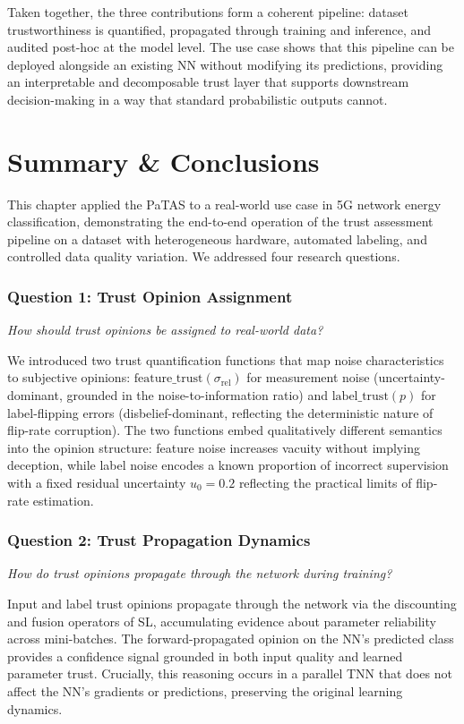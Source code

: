 Taken together, the three contributions form a coherent pipeline: dataset trustworthiness is quantified, propagated through training and inference, and audited post-hoc at the model level. The use case shows that this pipeline can be deployed alongside an existing \ac{NN} without modifying its predictions, providing an interpretable and decomposable trust layer that supports downstream decision-making in a way that standard probabilistic outputs cannot.

\section{Summary \& Conclusions}
\label{sec:conclusion}

This chapter applied the \acf{PaTAS} to a real-world use case in 5G network energy classification, demonstrating the end-to-end operation of the trust assessment pipeline on a dataset with heterogeneous hardware, automated labeling, and controlled data quality variation. We addressed four research questions.


\subsubsection*{Question 1: Trust Opinion Assignment}

\emph{How should trust opinions be assigned to real-world data?}

We introduced two trust quantification functions that map noise characteristics to subjective opinions: $\text{feature\_trust}(\sigma_{\text{rel}})$ for measurement noise (uncertainty-dominant, grounded in the noise-to-information ratio) and $\text{label\_trust}(p)$ for label-flipping errors (disbelief-dominant, reflecting the deterministic nature of flip-rate corruption). The two functions embed qualitatively different semantics into the opinion structure: feature noise increases vacuity without implying deception, while label noise encodes a known proportion of incorrect supervision with a fixed residual uncertainty $u_0 = 0.2$ reflecting the practical limits of flip-rate estimation.


\subsubsection*{Question 2: Trust Propagation Dynamics}

\emph{How do trust opinions propagate through the network during training?}

Input and label trust opinions propagate through the network via the discounting and fusion operators of \ac{SL}, accumulating evidence about parameter reliability across mini-batches. The forward-propagated opinion on the \ac{NN}'s predicted class provides a confidence signal grounded in both input quality and learned parameter trust. Crucially, this reasoning occurs in a parallel \ac{TNN} that does not affect the \ac{NN}'s gradients or predictions, preserving the original learning dynamics.


